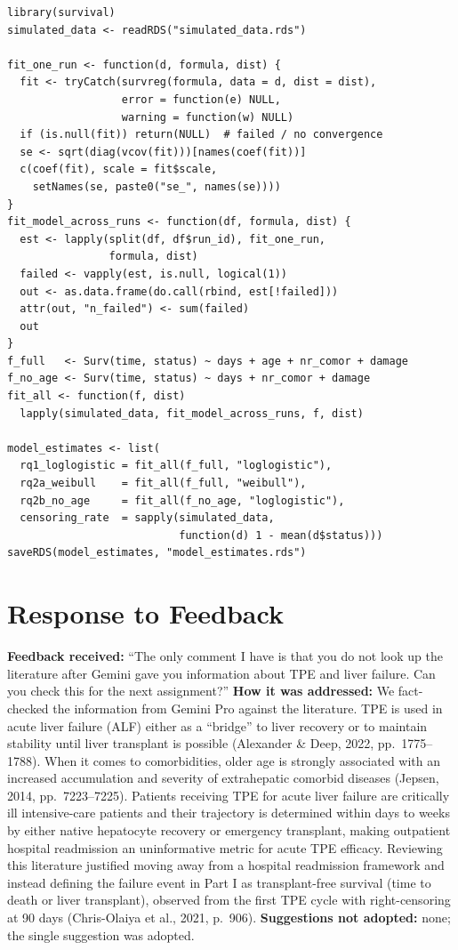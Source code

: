 \documentclass[10pt,a4paper]{article}
\begin{document}
\begin{minipage}[t]{0.49\textwidth}
\begin{lstlisting}[style=rcode]
library(survival)
simulated_data <- readRDS("simulated_data.rds")

fit_one_run <- function(d, formula, dist) {
  fit <- tryCatch(survreg(formula, data = d, dist = dist),
                  error = function(e) NULL,
                  warning = function(w) NULL)
  if (is.null(fit)) return(NULL)  # failed / no convergence
  se <- sqrt(diag(vcov(fit)))[names(coef(fit))]
  c(coef(fit), scale = fit$scale,
    setNames(se, paste0("se_", names(se))))
}
fit_model_across_runs <- function(df, formula, dist) {
  est <- lapply(split(df, df$run_id), fit_one_run,
                formula, dist)
  failed <- vapply(est, is.null, logical(1))
  out <- as.data.frame(do.call(rbind, est[!failed]))
  attr(out, "n_failed") <- sum(failed)
  out
}
f_full   <- Surv(time, status) ~ days + age + nr_comor + damage
f_no_age <- Surv(time, status) ~ days + nr_comor + damage
fit_all <- function(f, dist)
  lapply(simulated_data, fit_model_across_runs, f, dist)

model_estimates <- list(
  rq1_loglogistic = fit_all(f_full, "loglogistic"),
  rq2a_weibull    = fit_all(f_full, "weibull"),
  rq2b_no_age     = fit_all(f_no_age, "loglogistic"),
  censoring_rate  = sapply(simulated_data,
                           function(d) 1 - mean(d$status)))
saveRDS(model_estimates, "model_estimates.rds")
\end{lstlisting}
\end{minipage}

\section*{Response to Feedback}
\textbf{Feedback received:} ``The only comment I have is that you do not look up the literature after Gemini gave you information about TPE and liver failure. Can you check this for the next assignment?''
\textbf{How it was addressed:} We fact-checked the information from Gemini Pro against the literature. TPE is used in acute liver failure (ALF) either as a ``bridge'' to liver recovery or to maintain stability until liver transplant is possible (Alexander \& Deep, 2022, pp.~1775--1788). When it comes to comorbidities, older age is strongly associated with an increased accumulation and severity of extrahepatic comorbid diseases (Jepsen, 2014, pp.~7223--7225). Patients receiving TPE for acute liver failure are critically ill intensive-care patients and their trajectory is determined within days to weeks by either native hepatocyte recovery or emergency transplant, making outpatient hospital readmission an uninformative metric for acute TPE efficacy. Reviewing this literature justified moving away from a hospital readmission framework and instead defining the failure event in Part I as transplant-free survival (time to death or liver transplant), observed from the first TPE cycle with right-censoring at 90 days (Chris-Olaiya et al., 2021, p.~906).
\textbf{Suggestions not adopted:} none; the single suggestion was adopted.
\end{document}

